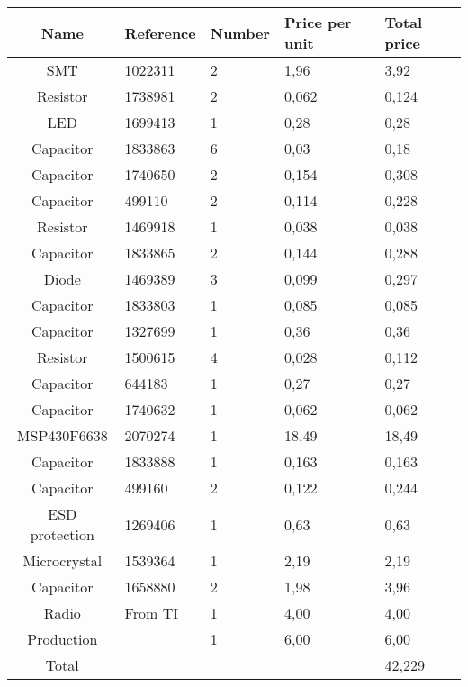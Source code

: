 \begin{tabular}{| c |l | l | l | l |} 
	\hline
		Name & Reference & Number & Price per unit & Total price\\ \hline
		SMT & 1022311 & 2 & 1,96 & 3,92\\ \hline
		Resistor & 1738981 & 2 & 0,062 & 0,124\\ \hline
		LED & 1699413 & 1 & 0,28 & 0,28\\ \hline
		Capacitor & 1833863 & 6 & 0,03 & 0,18\\ \hline
		Capacitor & 1740650 & 2 & 0,154 & 0,308\\ \hline
		Capacitor & 499110 & 2 & 0,114 & 0,228\\ \hline
		Resistor & 1469918 & 1 & 0,038 & 0,038\\ \hline
		Capacitor & 1833865 & 2 & 0,144 & 0,288\\ \hline
		Diode & 1469389 & 3 & 0,099 & 0,297\\ \hline
	   	Capacitor & 1833803 & 1 & 0,085 & 0,085\\ \hline
 		Capacitor & 1327699 & 1 & 0,36 & 0,36 \\ \hline
  		Resistor & 1500615 & 4 & 0,028 & 0,112\\ \hline
	 	Capacitor & 644183 & 1 & 0,27 & 0,27 \\ \hline
	 	Capacitor & 1740632 & 1 & 0,062 & 0,062\\ \hline
	 	MSP430F6638 & 2070274 & 1 & 18,49 & 18,49\\ \hline
	 	Capacitor & 1833888 & 1 & 0,163 & 0,163\\ \hline
	 	Capacitor & 499160 & 2 & 0,122 & 0,244\\ \hline
	 	ESD protection & 1269406 & 1 & 0,63 & 0,63\\ \hline
	 	Microcrystal & 1539364 & 1 & 2,19 & 2,19\\ \hline
	 	Capacitor & 1658880 & 2 & 1,98 & 3,96\\ \hline
	 	Radio & From TI & 1 & 4,00 & 4,00\\ \hline
		Production & & 1 & 6,00 & 6,00\\ \hline
	 	Total &  &  &  & 42,229\\ \hline
	\hline
\end{tabular}\\\\

